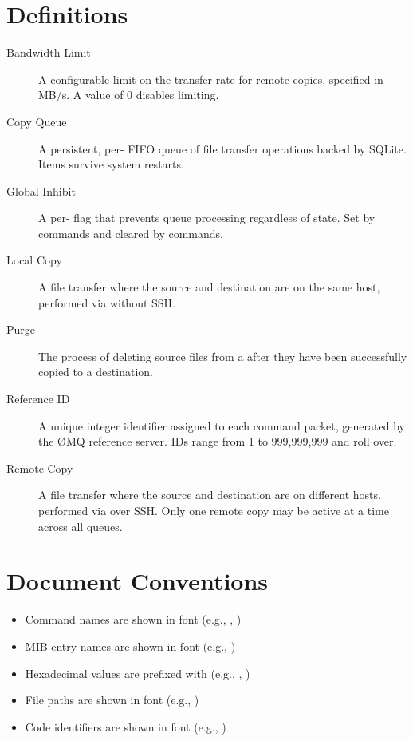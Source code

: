 \section{Definitions}

\begin{description}
    \item[Bandwidth Limit] A configurable limit on the transfer rate for remote copies, specified in MB/s. A value of 0 disables limiting.

    \item[Copy Queue] A persistent, per-\DR{} FIFO queue of file transfer operations backed by SQLite. Items survive system restarts.

    \item[Global Inhibit] A per-\DR{} flag that prevents queue processing regardless of \DR{} state. Set by  commands and cleared by  commands.

    \item[Local Copy] A file transfer where the source and destination are on the same host, performed via  without SSH.

    \item[Purge] The process of deleting source files from a \DR{} after they have been successfully copied to a destination.

    \item[Reference ID] A unique integer identifier assigned to each command packet, generated by the \O{}MQ reference server. IDs range from 1 to 999,999,999 and roll over.

    \item[Remote Copy] A file transfer where the source and destination are on different hosts, performed via  over SSH. Only one remote copy may be active at a time across all \DR{} queues.

\end{description}

\section{Document Conventions}

\begin{itemize}
    \item Command names are shown in  font (e.g., , )
    \item MIB entry names are shown in  font (e.g., )
    \item Hexadecimal values are prefixed with \hex{} (e.g., , )
    \item File paths are shown in  font (e.g., )
    \item Code identifiers are shown in  font (e.g., )
\end{itemize}

